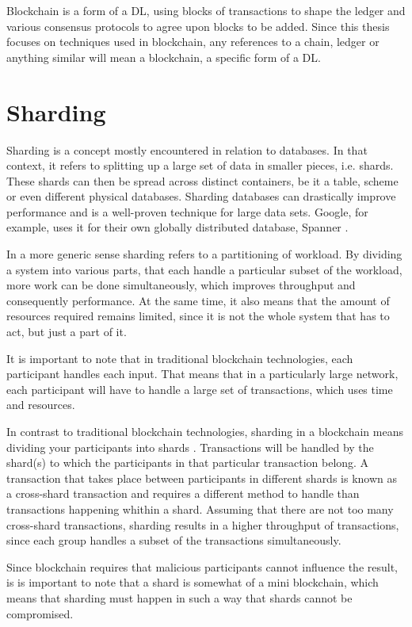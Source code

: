 Blockchain is a form of a DL, using blocks of transactions to shape the ledger and various consensus protocols to agree upon blocks to be added. Since this thesis focuses on techniques used in blockchain, any references to a chain, ledger or anything similar will mean a blockchain, a specific form of a DL.

\section{Sharding} \label{Sharding}
Sharding is a concept mostly encountered in relation to databases. \cite{DbSharding} In that context, it refers to splitting up a large set of data in smaller pieces, i.e. shards. These shards can then be spread across distinct containers, be it a table, scheme or even different physical databases. Sharding databases can drastically improve performance and is a well-proven technique for large data sets. Google, for example, uses it for their own globally distributed database, Spanner \cite{Spanner}.

In a more generic sense sharding refers to a partitioning of workload. By dividing a system into various parts, that each handle a particular subset of the workload, more work can be done simultaneously, which improves throughput and consequently performance. At the same time, it also means that the amount of resources required remains limited, since it is not the whole system that has to act, but just a part of it.

It is important to note that in traditional blockchain technologies, each participant handles each input. That means that in a particularly large network, each participant will have to handle a large set of transactions, which uses time and resources.

In contrast to traditional blockchain technologies, sharding in a blockchain means dividing your participants into shards \cite{OmniLedger}. Transactions will be handled by the shard(s) to which the participants in that particular transaction belong. A transaction that takes place between participants in different shards is known as a cross-shard transaction and requires a different method to handle than transactions happening whithin a shard. Assuming that there are not too many cross-shard transactions, sharding results in a higher throughput of transactions, since each group handles a subset of the transactions simultaneously.

Since blockchain requires that malicious participants cannot influence the result, is is important to note that a shard is somewhat of a mini blockchain, which means that sharding must happen in such a way that shards cannot be compromised.

